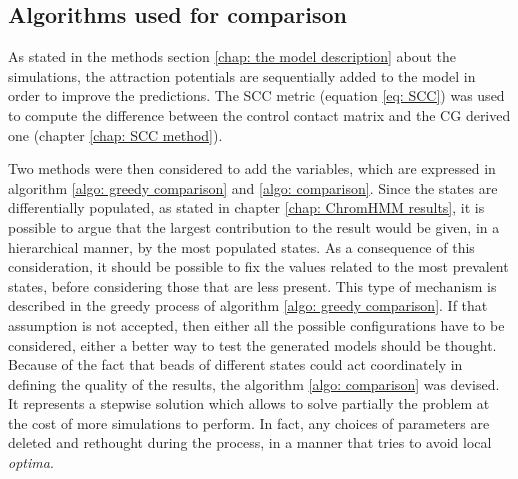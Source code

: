 \subsection{Algorithms used for comparison} \label{methods: confront matrices}

As stated in the methods section \ref{chap: the model description} about the simulations, the attraction potentials are sequentially added to the model in order to improve the predictions. The SCC metric (equation \ref{eq: SCC}) was used to compute the difference between the control contact matrix and the CG derived one (chapter \ref{chap: SCC method}).

Two methods were then considered to add the variables, which are expressed in algorithm \ref{algo: greedy comparison} and \ref{algo: comparison}. Since the states are differentially populated, as stated in chapter \ref{chap: ChromHMM results}, it is possible to argue that the largest contribution to the result would be given, in a hierarchical manner, by the most populated states. As a consequence of this consideration, it should be possible to fix the values related to the most prevalent states, before considering those that are less present. This type of mechanism is described in the greedy process of algorithm \ref{algo: greedy comparison}. If that assumption is not accepted, then either all the possible configurations have to be considered, either a better way to test the generated models should be thought.\\

Because of the fact that beads of different states could act coordinately in defining the quality of the results, the algorithm \ref{algo: comparison} was devised. It represents a stepwise solution which allows to solve partially the problem at the cost of more simulations to perform. In fact, any choices of parameters are deleted and rethought during the process, in a manner that tries to avoid local \textit{optima}.\\

